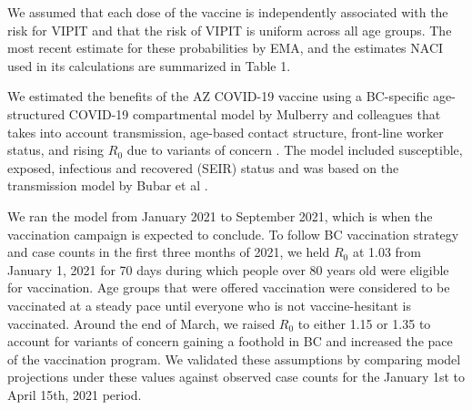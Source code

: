 \documentclass[]{interact}
\theoremstyle{plain}%
\theoremstyle{definition}
\theoremstyle{remark}
\begin{document}
We assumed that each dose of the vaccine is independently associated
with the risk for VIPIT and that the risk of VIPIT is uniform across all
age groups. The most recent estimate for these probabilities by EMA, and
the estimates NACI used in its calculations are summarized in Table 1.

We estimated the benefits of the AZ COVID-19 vaccine using a BC-specific
age-structured COVID-19 compartmental model by Mulberry and colleagues
that takes into account transmission, age-based contact structure,
front-line worker status, and rising \(R_0\) due to variants of concern
\citep{mulberry_vaccine_2021}. The model included susceptible, exposed,
infectious and recovered (SEIR) status and was based on the transmission
model by Bubar et al \citep{bubar_model-informed_2021}.

We ran the model from January 2021 to September 2021, which is when the
vaccination campaign is expected to conclude. To follow BC vaccination
strategy and case counts in the first three months of 2021, we held
\(R_0\) at 1.03 from January 1, 2021 for 70 days during which people
over 80 years old were eligible for vaccination. Age groups that were
offered vaccination were considered to be vaccinated at a steady pace
until everyone who is not vaccine-hesitant is vaccinated. Around the end
of March, we raised \(R_0\) to either 1.15 or 1.35 to account for
variants of concern gaining a foothold in BC and increased the pace of
the vaccination program. We validated these assumptions by comparing
model projections under these values against observed case counts for
the January 1st to April 15th, 2021 period.
\end{document}
